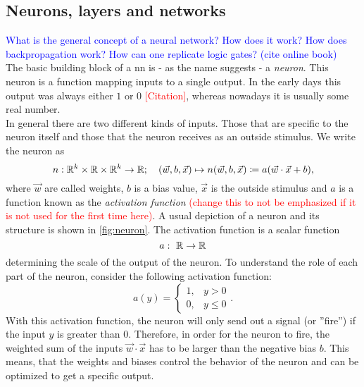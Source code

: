 \subsection{Neurons, layers and networks}\label{sec:basics_neuron_network}
\textcolor{blue}{What is the general concept of a neural network? How does it work? How does backpropagation work? How can one replicate logic gates? (cite online book)}\\
\noindent The basic building block of a \gls{nn} is - as the name suggests - a \emph{neuron}. This neuron is a function mapping inputs to a single output. In the early days this output was always either $1$ or $0$ \textcolor{red}{[Citation]}, whereas nowadays it is usually some real number.\\
In general there are two different kinds of inputs. Those that are specific to the neuron itself and those that the neuron receives as an outside stimulus. We write the neuron as
\begin{equation}\label{def:neuron}
n: \mathbb{R}^k\times\mathbb{R}\times\mathbb{R}^k\to\mathbb{R} ;\ \ \ (\vec{w}, b, \vec{x})\mapsto n(\vec{w}, b, \vec{x})\coloneqq a(\vec{w}\cdot\vec{x}+b),
\end{equation}
where $\vec{w}$ are called weights, $b$ is a bias value, $\vec{x}$ is the outside stimulus and $a$ is a function known as the \emph{activation function}\textcolor{red}{ (change this to not be emphasized if it is not used for the first time here)}. A usual depiction of a neuron and its structure is shown in \autoref{fig:neuron}. The activation function is a scalar function
\begin{equation}\label{def:activation_function}
a:\ \mathbb{R}\to\mathbb{R}
\end{equation}
determining the scale of the output of the neuron. To understand the role of each part of the neuron, consider the following activation function:
\begin{equation}\label{def:step_activation}
a(y) = 
\begin{cases}
	1,& y> 0\\
	0,& y\leq 0
\end{cases}.
\end{equation}
With this activation function, the neuron will only send out a signal (or ''fire'') if the input $y$ is greater than 0. Therefore, in order for the neuron to fire, the weighted sum of the inputs $\vec{w}\cdot\vec{x}$ has to be larger than the negative bias $b$. This means, that the weights and biases control the behavior of the neuron and can be optimized to get a specific output.\\

